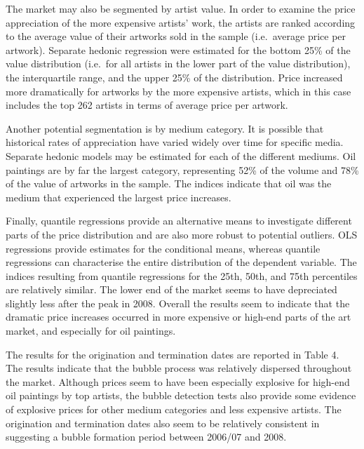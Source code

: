 \documentclass[]{elsarticle} %
\begin{document}
The market may also be segmented by artist value. In order to examine
the price appreciation of the more expensive artists' work, the artists
are ranked according to the average value of their artworks sold in the
sample (i.e.~average price per artwork). Separate hedonic regression
were estimated for the bottom 25\% of the value distribution (i.e.~for
all artists in the lower part of the value distribution), the
interquartile range, and the upper 25\% of the distribution. Price
increased more dramatically for artworks by the more expensive artists,
which in this case includes the top 262 artists in terms of average
price per artwork.

Another potential segmentation is by medium category. It is possible
that historical rates of appreciation have varied widely over time for
specific media. Separate hedonic models may be estimated for each of the
different mediums. Oil paintings are by far the largest category,
representing 52\% of the volume and 78\% of the value of artworks in the
sample. The indices indicate that oil was the medium that experienced
the largest price increases.

Finally, quantile regressions provide an alternative means to
investigate different parts of the price distribution and are also more
robust to potential outliers. OLS regressions provide estimates for the
conditional means, whereas quantile regressions can characterise the
entire distribution of the dependent variable. The indices resulting
from quantile regressions for the 25th, 50th, and 75th percentiles are
relatively similar. The lower end of the market seems to have
depreciated slightly less after the peak in 2008. Overall the results
seem to indicate that the dramatic price increases occurred in more
expensive or high-end parts of the art market, and especially for oil
paintings.

The results for the origination and termination dates are reported in
Table 4. The results indicate that the bubble process was relatively
dispersed throughout the market. Although prices seem to have been
especially explosive for high-end oil paintings by top artists, the
bubble detection tests also provide some evidence of explosive prices
for other medium categories and less expensive artists. The origination
and termination dates also seem to be relatively consistent in
suggesting a bubble formation period between 2006/07 and 2008.
\end{document}

